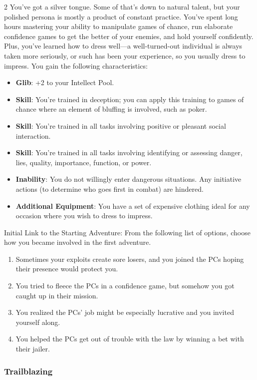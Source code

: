 \begin{multicols}{2}
You’ve got a silver tongue. Some of that’s down to natural talent, but your polished persona is mostly a product of constant practice. You’ve spent long hours mastering your ability to manipulate games of chance, run elaborate confidence games to get the better of your enemies, and hold yourself confidently. Plus, you’ve learned how to dress well—a well-turned-out individual is always taken more seriously, or such has been your experience, so you usually dress to impress.
You gain the following characteristics: 
\begin{itemize}
\item \textbf{Glib}: +2 to your Intellect Pool. 
\item \textbf{Skill}: You’re trained in deception; you can apply this training to games of chance where an element of bluffing is involved, such as poker. 
\item \textbf{Skill}: You’re trained in all tasks involving positive or pleasant social interaction. 
\item \textbf{Skill}: You’re trained in all tasks involving identifying or assessing danger, lies, quality, importance, function, or power. 
\item \textbf{Inability}: You do not willingly enter dangerous situations. Any initiative actions (to determine who goes first in combat) are hindered. 
\item \textbf{Additional Equipment}: You have a set of expensive clothing ideal for any occasion where you wish to dress to impress.
\end{itemize}
Initial Link to the Starting Adventure: From the following list of options, choose how you became involved in the first adventure. 
\begin{enumerate}
\item Sometimes your exploits create sore losers, and you joined the PCs hoping their presence would protect you. 
\item You tried to fleece the PCs in a confidence game, but somehow you got caught up in their mission. 
\item You realized the PCs’ job might be especially lucrative and you invited yourself along. 
\item You helped the PCs get out of trouble with the law by winning a bet with their jailer.
\end{enumerate}

\subsubsection{Trailblazing}
 

\end{multicols}
